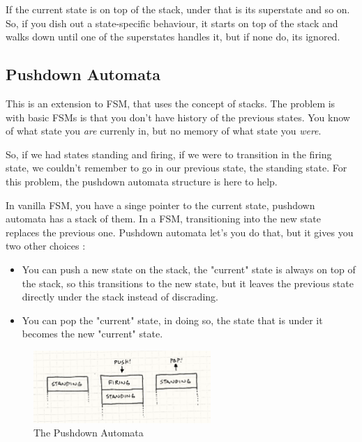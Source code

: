 \documentclass[a4paper, 12pt]{book}
\begin{document}
If the current state is on top of the stack, under that is its superstate and so on. So, if you dish out a state-specific behaviour, it starts on top of the stack and walks down until one of the superstates handles it, but if none do, its ignored.

\subsection{Pushdown Automata}

This is an extension to FSM, that uses the concept of stacks. The problem is with basic FSMs is that you don't have history of the previous states. You know of what state you \emph{are} currenly in, but no memory of what state you \emph{were}.

So, if we had states standing and firing, if we were to transition in the firing state, we couldn't remember to go in our previous state, the standing state. For this problem, the pushdown automata structure is here to help.

In vanilla FSM, you have a singe pointer to the current state, pushdown automata has a stack of them. In a FSM, transitioning into the new state replaces the previous one. Pushdown automata let's you do that, but it gives you two other choices \cite{GameProgrammingPattersFMS}:

\begin{itemize}
    \item You can push a new state on the stack, the "current" state is always on top of the stack, so this transitions to the new state, but it leaves the previous state directly under the stack instead of discrading.
    \item You can pop the "current" state, in doing so, the state that is under it becomes the new "current" state.
\end{itemize}

\begin{figure}[h]
\begin{center}
\includegraphics[width=0.6\textwidth]{Images/state_pushdown.png}
\end{center}
\caption{The Pushdown Automata}
\label{pic2}
\end{figure}
\end{document}
